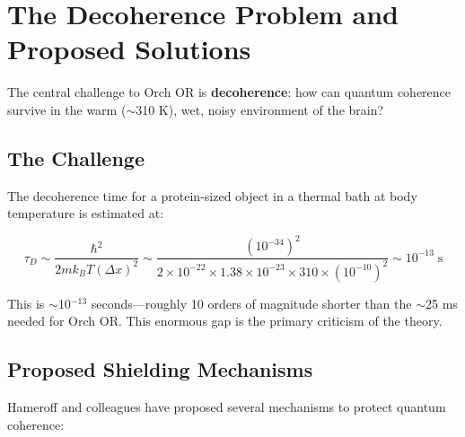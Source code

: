 \documentclass[11pt,a4paper]{report}
\begin{document}
\chapter{The Decoherence Problem and Proposed Solutions}

The central challenge to Orch OR is \textbf{decoherence}: how can quantum coherence survive in the warm ($\sim$310 K), wet, noisy environment of the brain?

\section{The Challenge}

The decoherence time for a protein-sized object in a thermal bath at body temperature is estimated at:

\begin{mathbox}
\vspace{-8pt}
\[
  \tau_D \sim \frac{\hbar^2}{2mk_BT(\Delta x)^2} \sim \frac{(10^{-34})^2}{2 \times 10^{-22} \times 1.38 \times 10^{-23} \times 310 \times (10^{-10})^2} \sim 10^{-13}\;\text{s}
\]
\vspace{-10pt}
\end{mathbox}

This is $\sim$10$^{-13}$ seconds---roughly 10 orders of magnitude shorter than the $\sim$25 ms needed for Orch OR. This enormous gap is the primary criticism of the theory.

\section{Proposed Shielding Mechanisms}

Hameroff and colleagues have proposed several mechanisms to protect quantum coherence:
\end{document}
